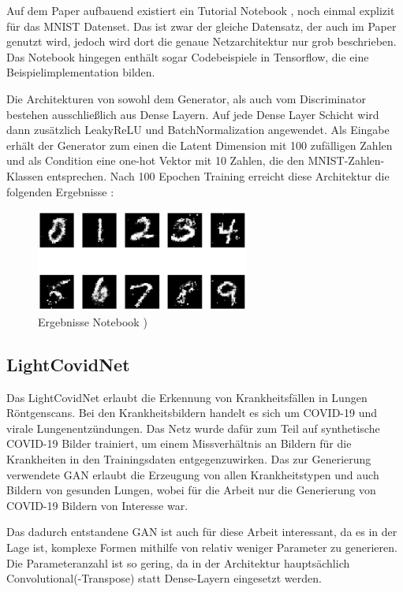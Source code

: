 Auf dem Paper aufbauend existiert ein Tutorial Notebook \cite{cgan-tutorial-notebook}, noch einmal explizit für das MNIST Datenset.
Das ist zwar der gleiche Datensatz, der auch im Paper genutzt wird, jedoch wird dort die genaue Netzarchitektur nur grob beschrieben.
Das Notebook hingegen enthält sogar Codebeispiele in Tensorflow, die eine Beispielimplementation bilden.
\newline

Die Architekturen von sowohl dem Generator, als auch vom Discriminator bestehen ausschließlich aus Dense Layern.
Auf jede Dense Layer Schicht wird dann zusätzlich LeakyReLU und BatchNormalization angewendet.
Als Eingabe erhält der Generator zum einen die Latent Dimension mit 100 zufälligen Zahlen und als Condition eine one-hot Vektor mit 10 Zahlen, die den MNIST-Zahlen-Klassen entsprechen.
Nach 100 Epochen Training erreicht diese Architektur die folgenden Ergebnisse :

\begin{figure}[H]
	\centering
	\includegraphics[width=7cm]{kapitel/2_stand_der_technik/img/cgan-notebook-ergebnisse.png}
	\caption{Ergebnisse Notebook \cite{cgan-tutorial-notebook}) }
\end{figure}

\subsection{LightCovidNet}
Das LightCovidNet \cite{inspiration-dc-gan-med} erlaubt die Erkennung von Krankheitsfällen in Lungen Röntgenscans.
Bei den Krankheitsbildern handelt es sich um COVID-19 und virale Lungenentzündungen.
Das Netz wurde dafür zum Teil auf synthetische COVID-19 Bilder trainiert, um einem Missverhältnis an Bildern für die Krankheiten in den Trainingsdaten entgegenzuwirken.
Das zur Generierung verwendete GAN erlaubt die Erzeugung von allen Krankheitstypen und auch Bildern von gesunden Lungen, wobei für die Arbeit nur die Generierung von COVID-19 Bildern von Interesse war.
\newline

Das dadurch entstandene GAN ist auch für diese Arbeit interessant, da es in der Lage ist, komplexe Formen mithilfe von relativ weniger Parameter zu generieren.
Die Parameteranzahl ist so gering, da in der Architektur hauptsächlich Convolutional(-Transpose) statt Dense-Layern eingesetzt werden.

